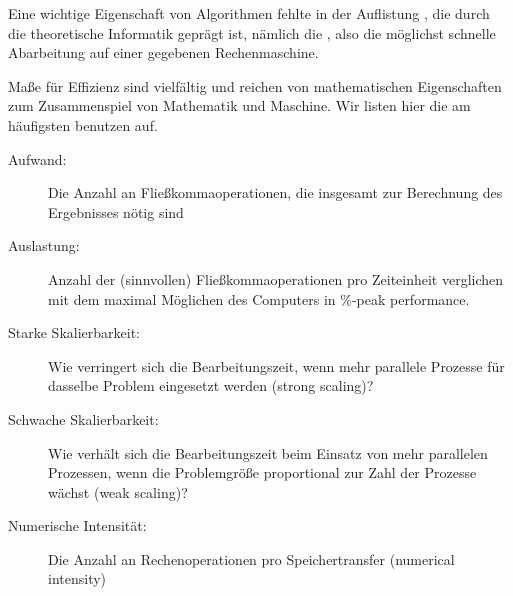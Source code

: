 \begin{remark}
  Eine wichtige Eigenschaft von Algorithmen fehlte in der Auflistung
  , die durch die
  theoretische Informatik geprägt ist, nämlich die ,
  also die möglichst schnelle Abarbeitung auf einer gegebenen
  Rechenmaschine.

  Maße für Effizienz sind vielfältig und reichen von mathematischen
  Eigenschaften zum Zusammenspiel von Mathematik und Maschine. Wir
  listen hier die am häufigsten benutzen auf.

  \begin{description}
  \item[Aufwand:] Die Anzahl an Fließkommaoperationen, die insgesamt
    zur Berechnung des Ergebnisses nötig sind
  \item[Auslastung:] Anzahl der (sinnvollen) Fließkommaoperationen pro
    Zeiteinheit verglichen mit dem maximal Möglichen des Computers in
    \glqq\%-peak performance\grqq.
  \item[Starke Skalierbarkeit:] Wie verringert sich die
    Bearbeitungszeit, wenn mehr parallele Prozesse für dasselbe
    Problem eingesetzt werden (strong scaling)?
  \item[Schwache Skalierbarkeit:] Wie verhält sich die
    Bearbeitungszeit beim Einsatz von mehr parallelen Prozessen, wenn
    die Problemgröße proportional zur Zahl der Prozesse wächst (weak scaling)?
  \item[Numerische Intensität:] Die Anzahl an Rechenoperationen pro
    Speichertransfer (numerical intensity)
  \end{description}
\end{remark}

